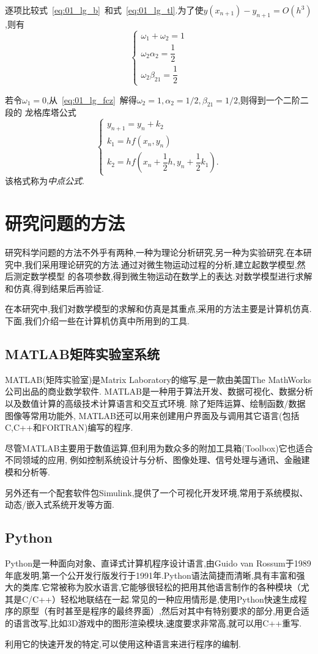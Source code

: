逐项比较式~\ref{eq:01_lg_b}~和式~\ref{eq:01_lg_tl}.为了使$y(x_{n+1})-y_{n+1}=O(h^3)$,则有
\begin{equation}\label{eq:01_lg_fcz}
 \begin{cases}
  \omega_1+\omega_2 =1 \\[0.6em]
  \omega_2\alpha_2=\dfrac{1}{2} \\[0.6em]
  \omega_2\beta_{21}=\dfrac{1}{2} 
 \end{cases}
\end{equation}\par
若令$\omega_1=0$,从~\ref{eq:01_lg_fcz}~解得$\omega_2=1,\alpha_2=1/2,\beta_{21}=1/2$,则得到一个二阶二段的
龙格库塔公式
\begin{equation}
 \begin{cases}
  y_{n+1} =y_n+k_2 \\
  k_1=hf(x_n,y_n) \\
  k_2=hf\left(x_n+\dfrac{1}{2}h,y_n+\dfrac{1}{2}k_1\right).
 \end{cases}
\end{equation}
该格式称为\emph{中点公式}.
\section{研究问题的方法}
研究科学问题的方法不外乎有两种,一种为理论分析研究,另一种为实验研究.在本研究中,我们采用理论研究的方法.通过对微生物运动过程的分析,建立起数学模型,然后测定数学模型
的各项参数,得到微生物运动在数学上的表达.对数学模型进行求解和仿真,得到结果后再验证.\par
在本研究中,我们对数学模型的求解和仿真是其重点,采用的方法主要是计算机仿真.下面,我们介绍一些在计算机仿真中所用到的工具.
\subsection{MATLAB矩阵实验室系统}
MATLAB(矩阵实验室)是Matrix Laboratory的缩写,是一款由美国The MathWorks公司出品的商业数学软件.
MATLAB是一种用于算法开发、数据可视化、数据分析以及数值计算的高级技术计算语言和交互式环境.
除了矩阵运算、绘制函数/数据图像等常用功能外,
MATLAB还可以用来创建用户界面及与调用其它语言(包括C,C++和FORTRAN)编写的程序.\par
尽管MATLAB主要用于数值运算,但利用为数众多的附加工具箱(Toolbox)它也适合不同领域的应用,
例如控制系统设计与分析、图像处理、信号处理与通讯、金融建模和分析等.\par
另外还有一个配套软件包Simulink,提供了一个可视化开发环境,常用于系统模拟、动态/嵌入式系统开发等方面.
\subsection{Python}
Python是一种面向对象、直译式计算机程序设计语言,由Guido van Rossum于1989年底发明,第一个公开发行版发行于1991年.Python语法简捷而清晰,具有丰富和强大的类库.它常被称为胶水语言,它能够很轻松的把用其他语言制作的各种模块（尤其是C/C++）轻松地联结在一起.常见的一种应用情形是,使用Python快速生成程序的原型（有时甚至是程序的最终界面）,然后对其中有特别要求的部分,用更合适的语言改写,比如3D游戏中的图形渲染模块,速度要求非常高,就可以用C++重写.\par
利用它的快速开发的特定,可以使用这种语言来进行程序的编制.
